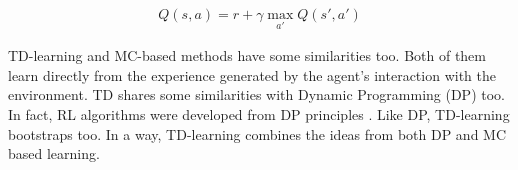 \begin{align}
    Q(s,a) = r + \gamma \max_{a'}Q(s',a')
\end{align}

TD-learning and MC-based methods have some similarities too. Both of them learn directly from the experience generated by the agent's interaction with the environment. TD shares some similarities with Dynamic Programming (DP) too. In fact, RL algorithms were developed from DP principles \parencite{bellman1957markovian}. Like DP, TD-learning bootstraps too. In a way, TD-learning combines the ideas from both DP and MC based learning.

